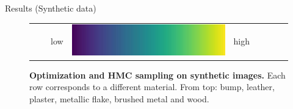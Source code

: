 \documentclass[final]{beamer}
\newlength{\twocolwid}
\newlength{\resultwidth}
\begin{document}
\begin{frame}[t]
\begin{columns}[t]
\begin{column}{\twocolwid}
\begin{block}{Results (Synthetic data)}
\begin{figure}[t]
\begin{tabular}{ccrclcccc}
            		& & low &
            		\includegraphics[width=\resultwidth]{images/other/colorbar.jpg} &
            		high & & &
            	\end{tabular}
            	\caption{\label{fig:synth}
            		\textbf{Optimization and HMC sampling on synthetic images.} Each row corresponds to a different material. From top: bump, leather, plaster, metallic flake, brushed metal and wood.
            	}
            \end{figure}
        \end{block}
    \end{column}
    

\end{columns}
\end{frame}
\end{document}
